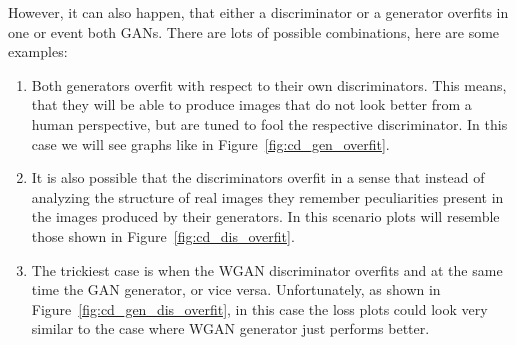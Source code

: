	
However, it can also happen, that either a discriminator or a generator overfits in one or event both GANs. There are lots of possible combinations, here are some examples:
\begin{enumerate}
	\item Both generators overfit with respect to their own discriminators. This means, that they will be able to produce images that do not look better from a human perspective, but are tuned to fool the respective discriminator. In this case we will see graphs like in Figure~\ref{fig:cd_gen_overfit}.
	\item It is also possible that the discriminators overfit in a sense that instead of analyzing the structure of real images they remember peculiarities present in the images produced by their generators. In this scenario plots will resemble those shown in Figure~\ref{fig:cd_dis_overfit}.
	\item The trickiest case is when the WGAN discriminator overfits and at the same time the GAN generator, or vice versa. Unfortunately, as shown in Figure~\ref{fig:cd_gen_dis_overfit}, in this case the loss plots could look very similar to the case where WGAN generator just performs better.
\end{enumerate}

